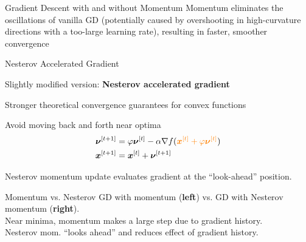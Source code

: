 \documentclass[11pt,compress,t,notes=noshow, xcolor=table]{beamer}
\begin{document}
\begin{framev}[align=center]{Gradient Descent with and without Momentum}
Momentum eliminates the oscillations of vanilla GD (potentially caused by overshooting in high-curvature directions with a too-large learning rate), resulting in faster, smoother convergence
\end{framev}


\begin{framei}{Nesterov Accelerated Gradient}
\item Slightly modified version: \textbf{Nesterov accelerated gradient}
\item Stronger theoretical convergence guarantees for convex functions
\item Avoid moving back and forth near optima
\begin{align*}
\bm{\nu}^{[t+1]} &= \varphi \bm{\nu}^{[t]} - \alpha \nabla f(\textcolor{orange}{\bm{x}^{[t]} + \varphi \bm{\nu}^{[t]}}) \\
\bm{x}^{[t+1]} &= \bm{x}^{[t]} + \bm{\nu}^{[t+1]}
\end{align*}
\vfill
\begin{footnotesize}
Nesterov momentum update evaluates gradient at the ``look-ahead'' position.
\end{footnotesize}
\end{framei}


\begin{framev}[fs=footnotesize]{Momentum vs. Nesterov}
\vfill
GD with momentum (\textbf{left}) vs. GD with Nesterov momentum (\textbf{right}).\\
Near minima, momentum makes a large step due to gradient history.\\
Nesterov mom. ``looks ahead'' and reduces effect of gradient history.
\end{framev}

\endlecture
\end{document}
